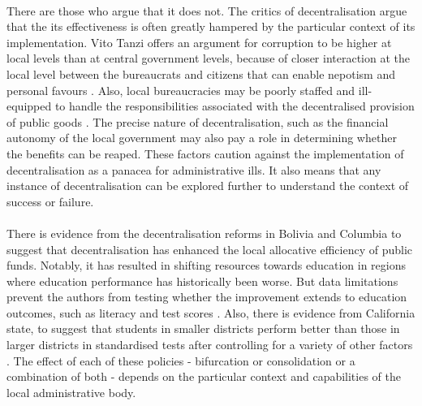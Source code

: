 \documentclass[12pt, a4paper]{article}
\begin{document}
\paragraph{}There are those who argue that it does not. The critics of decentralisation argue that the its effectiveness is often greatly hampered by the particular context of its implementation. Vito Tanzi offers an argument for corruption to be higher at local levels than at central government levels, because of closer interaction at the local level between the bureaucrats and citizens that can enable nepotism and personal favours \parencite{tanzi1996macroeconomic}. Also, local bureaucracies may be poorly staffed and ill-equipped to handle the responsibilities associated with the decentralised provision of public goods \parencite{prud1995dangers}. The precise nature of decentralisation, such as the financial autonomy of the local government may also pay a role in determining whether the benefits can be reaped. These factors caution against the implementation of decentralisation as a panacea for administrative ills. It also means that any instance of decentralisation can be explored further to understand the context of success or failure.
\paragraph{} There is evidence from the decentralisation reforms in Bolivia and Columbia to suggest that decentralisation has enhanced the local allocative efficiency of public funds. Notably, it has resulted in shifting resources towards education in regions where education performance has historically been worse. But data limitations prevent the authors from testing whether the improvement extends to education outcomes, such as literacy and test scores \parencite{faguet2008decentralization}. Also, there is evidence from California state, to suggest that students in smaller districts perform better than those in larger districts in standardised tests after controlling for a variety of other factors \parencite{driscoll2003school}. The effect of each of these policies - bifurcation or consolidation or a combination of both - depends on the particular context and capabilities of the local administrative body. 
\end{document}
